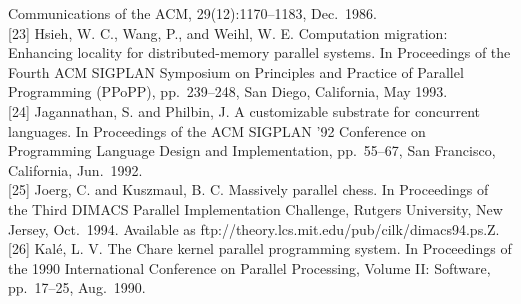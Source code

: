 \documentclass[
]{article}
\begin{document}
Communications of the ACM, 29(12):1170--1183, Dec.~1986.\\
{[}23{]} Hsieh, W. C., Wang, P., and Weihl, W. E. Computation migration:
Enhancing locality for distributed-memory parallel systems. In
Proceedings of the Fourth ACM SIGPLAN Symposium on Principles and
Practice of Parallel Programming (PPoPP), pp.~239--248, San Diego,
California, May 1993.\\
{[}24{]} Jagannathan, S. and Philbin, J. A customizable substrate for
concurrent languages. In Proceedings of the ACM SIGPLAN '92 Conference
on Programming Language Design and Implementation, pp.~55--67, San
Francisco, California, Jun.~1992.\\
{[}25{]} Joerg, C. and Kuszmaul, B. C. Massively parallel chess. In
Proceedings of the Third DIMACS Parallel Implementation Challenge,
Rutgers University, New Jersey, Oct.~1994. Available as
ftp://theory.lcs.mit.edu/pub/cilk/dimacs94.ps.Z.\\
{[}26{]} Kalé, L. V. The Chare kernel parallel programming system. In
Proceedings of the 1990 International Conference on Parallel Processing,
Volume II: Software, pp.~17--25, Aug.~1990.
\end{document}
